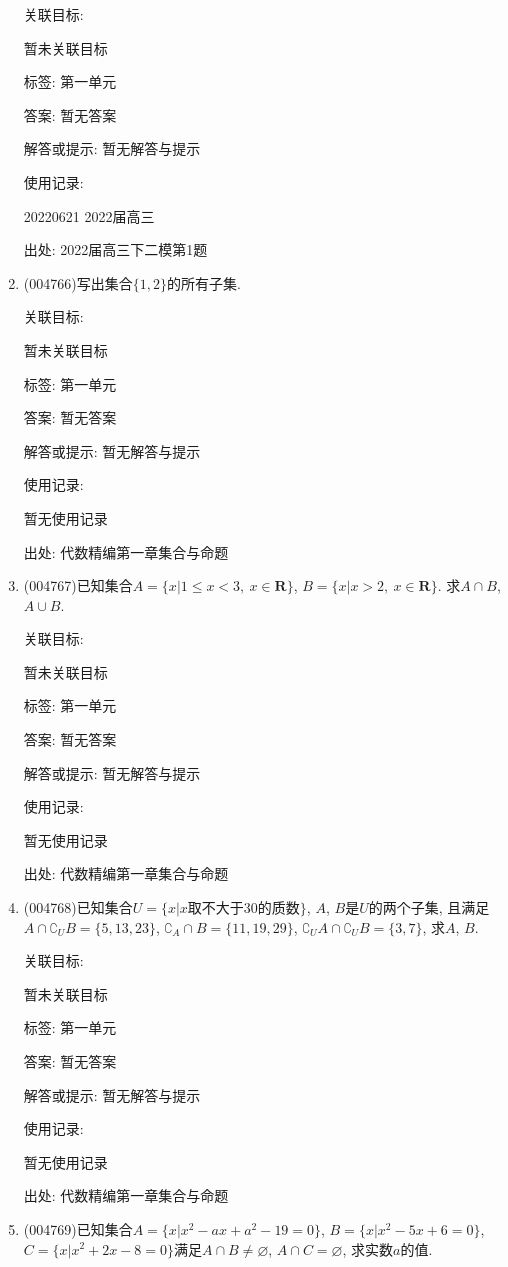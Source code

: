 \documentclass[10pt,a4paper]{article}
\begin{document}
\begin{enumerate}[1.]
关联目标:

暂未关联目标



标签: 第一单元

答案: 暂无答案

解答或提示: 暂无解答与提示

使用记录:

20220621	2022届高三	


出处: 2022届高三下二模第1题
\item { (004766)}写出集合$\{1,2\}$的所有子集.


关联目标:

暂未关联目标



标签: 第一单元

答案: 暂无答案

解答或提示: 暂无解答与提示

使用记录:

暂无使用记录


出处: 代数精编第一章集合与命题
\item { (004767)}已知集合$A=\{x|1 \le x<3,\ x\in \mathbf{R}\}$, $B=\{x|x>2,\ x\in \mathbf{R}\}$. 求$A\cap B$, $A\cup B$.


关联目标:

暂未关联目标



标签: 第一单元

答案: 暂无答案

解答或提示: 暂无解答与提示

使用记录:

暂无使用记录


出处: 代数精编第一章集合与命题
\item { (004768)}已知集合$U =\{x|x\text{取不大于}30\text{的质数}\}$, $A$, $B$是$U$的两个子集, 且满足$A\cap \complement_UB=\{5,13,23\}$, $\complement_A\cap B=\{11,19,29\}$, $\complement_UA\cap \complement_UB=\{3,7\}$, 求$A$, $B$.


关联目标:

暂未关联目标



标签: 第一单元

答案: 暂无答案

解答或提示: 暂无解答与提示

使用记录:

暂无使用记录


出处: 代数精编第一章集合与命题
\item { (004769)}已知集合$A=\{x|x^2- ax+a^2-19=0\}$, $B=\{x|x^2-5x+6=0\}$, $C=\{ x|x^2+2x-8=0\}$满足$A\cap B\ne \varnothing$, $A\cap C=\varnothing$, 求实数$a$的值.



\end{enumerate}
\end{document}
